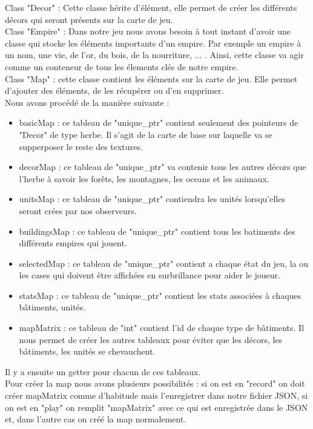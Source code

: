 \documentclass[12pt,a4paper]{article}
\begin{document}
Class "Decor" : Cette classe hérite d'élément, elle permet de créer les différents décors qui seront présents sur la carte de jeu.\\ 

Class "Empire" : Dans notre jeu nous avons besoin à tout instant d'avoir une classe qui stocke les éléments importants d'un empire. Par exemple un empire à un nom, une vie, de l'or, du bois, de la nourriture, ... . Ainsi, cette classe va agir comme un conteneur de tous les élements clés de notre empire.\\

Class "Map" : cette classe contient les éléments sur la carte de jeu. Elle permet d'ajouter des éléments, de les récupérer ou d'en supprimer. \\Nous avons procédé de la manière suivante : \begin{itemize}
    \item basicMap : ce tableau de "unique\_ptr" contient seulement des pointeurs de "Decor" de type herbe. Il s'agit de la carte de base sur laquelle va se supperposer le reste des textures. 
    \item decorMap : ce tableau de "unique\_ptr" va contenir tous les autres décors que l'herbe à savoir les forêts, les montagnes, les oceans et les animaux. 
    \item unitsMap : ce tableau de "unique\_ptr" contiendra les unités lorsqu'elles seront crées par nos observeurs. 
    \item buildingsMap : ce tableau de "unique\_ptr" contient tous les batiments des différents empires qui jouent. 
    \item selectedMap : ce tableau de "unique\_ptr" contient a chaque état du jeu, la ou les cases qui doivent être affichées en surbrillance pour aider le joueur. 
    \item statsMap : ce tableau de "unique\_ptr" contient les stats associées à chaques bâtiments, unités. 
    \item mapMatrix : ce tableau de "int" contient l'id de chaque type de bâtiments. Il nous permet de créer les autres tableaux pour éviter que les décors, les bâtiments, les unités se chevauchent.
\end{itemize}
Il y a ensuite un getter pour chacun de ces tableaux. \\Pour créer la map nous avons plusieurs possibilités : si on est en "record" on doit créer mapMatrix comme d'habitude mais l'enregistrer dans notre fichier JSON, si on est en "play" on remplit "mapMatrix" avec ce qui est enregistrée dans le JSON et, dans l'autre cas on créé la map normalement. \\
\end{document}
